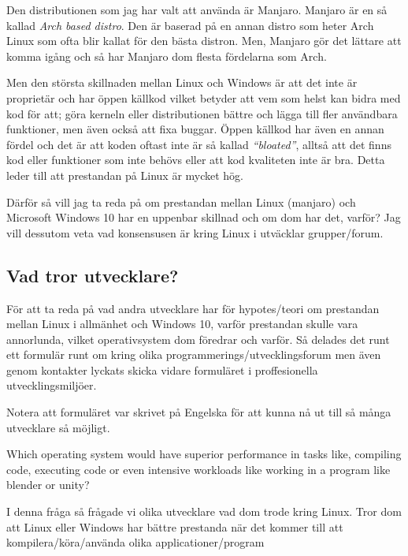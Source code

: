 \documentclass[12pt, a4paper]{report}
\begin{document}
    Den distributionen som jag har valt att använda är Manjaro\cite{manjaro}. Manjaro är en så kallad \textit{Arch based distro}. Den är baserad på en annan distro som heter Arch Linux som ofta blir kallat för den bästa distron. Men, Manjaro gör det lättare att komma igång och så har Manjaro dom flesta fördelarna som Arch.

    Men den största skillnaden mellan Linux och Windows är att det inte är proprietär och har öppen källkod vilket betyder att vem som helst kan bidra med kod för att; göra kerneln eller distributionen bättre och lägga till fler användbara funktioner, men även också att fixa buggar. Öppen källkod har även en annan fördel och det är att koden oftast inte är så kallad \textit{``bloated''}, alltså att det finns kod eller funktioner som inte behövs eller att kod kvaliteten inte är bra. Detta leder till att prestandan på Linux är mycket hög. 
    
    Därför så vill jag ta reda på om prestandan mellan Linux (manjaro) och Microsoft Windows 10 har en uppenbar skillnad och om dom har det, varför? Jag vill dessutom veta vad konsensusen är kring Linux i utväcklar grupper/forum.
\subsection{Vad tror utvecklare?}

    För att ta reda på vad andra utvecklare har för hypotes/teori om prestandan mellan Linux i allmänhet och Windows 10, varför prestandan skulle vara annorlunda, vilket operativsystem dom föredrar och varför.  Så delades det runt ett formulär runt om kring olika programmerings/utvecklingsforum men även genom kontakter lyckats skicka vidare formuläret i proffesionella utvecklingsmiljöer.

    Notera att formuläret var skrivet på Engelska för att kunna nå ut till så många utvecklare så möjligt.


    \vspace{2.7cm}


    \large {Which operating system would have superior performance in tasks like, compiling code, executing code or even intensive workloads like working in a program  like blender or unity?}

    \vspace{.5cm}

    \normalsize I denna fråga så frågade vi olika utvecklare vad dom trode kring Linux. Tror dom att Linux eller Windows har bättre prestanda när det kommer till att kompilera/köra/använda olika applicationer/program
\end{document}
